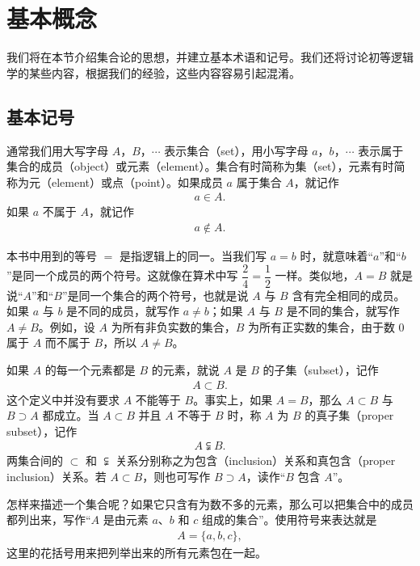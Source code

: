 \documentclass[../../main.tex]{subfiles}
\begin{document}
\section{基本概念}\label{section:ch01-基本概念}

我们将在本节介绍集合论的思想，并建立基本术语和记号。我们还将讨论初等逻辑学的某些内容，根据我们的经验，这些内容容易引起混淆。

\subsection*{基本记号}

通常我们用大写字母 $A$，$B$，$\cdots$ 表示集合（set），用小写字母 $a$，$b$，$\cdots$ 表示属于集合的成员（object）或元素（element）。集合有时简称为集（set），元素有时简称为元（element）或点（point）。如果成员 $a$ 属于集合 $A$，就记作
\begin{align*}
a \in A.
\end{align*}
如果 $a$ 不属于 $A$，就记作
\begin{align*}
a \notin A.
\end{align*}

本书中用到的等号 $=$ 是指逻辑上的同一。当我们写 $a = b$ 时，就意味着“$a$”和“$b$”是同一个成员的两个符号。这就像在算术中写 $\dfrac{2}{4} = \dfrac{1}{2}$ 一样。类似地，$A = B$ 就是说“$A$”和“$B$”是同一个集合的两个符号，也就是说 $A$ 与 $B$ 含有完全相同的成员。如果 $a$ 与 $b$ 是不同的成员，就写作 $a \neq b$；如果 $A$ 与 $B$ 是不同的集合，就写作 $A \neq B$。例如，设 $A$ 为所有非负实数的集合，$B$ 为所有正实数的集合，由于数 $0$ 属于 $A$ 而不属于 $B$，所以 $A \neq B$。

如果 $A$ 的每一个元素都是 $B$ 的元素，就说 $A$ 是 $B$ 的子集（subset），记作
\begin{align*}
A \subset B.
\end{align*}
这个定义中并没有要求 $A$ 不能等于 $B$。事实上，如果 $A = B$，那么 $A \subset B$ 与 $B \supset A$ 都成立。当 $A \subset B$ 并且 $A$ 不等于 $B$ 时，称 $A$ 为 $B$ 的真子集（proper subset），记作
\begin{align*}
A \subsetneqq B.
\end{align*}
两集合间的 $\subset$ 和 $\subsetneqq$ 关系分别称之为包含（inclusion）关系和真包含（proper inclusion）关系。若 $A \subset B$，则也可写作 $B \supset A$，读作“$B$ 包含 $A$”。

怎样来描述一个集合呢？如果它只含有为数不多的元素，那么可以把集合中的成员都列出来，写作“$A$ 是由元素 $a$、$b$ 和 $c$ 组成的集合”。使用符号来表达就是
\begin{align*}
A = \{a, b, c\},
\end{align*}
这里的花括号用来把列举出来的所有元素包在一起。
\end{document}
